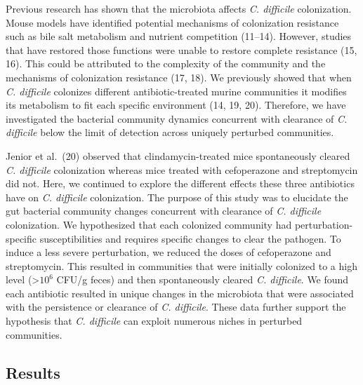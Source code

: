 \documentclass[12pt,]{article}
\begin{document}
Previous research has shown that the microbiota affects \emph{C.
difficile} colonization. Mouse models have identified potential
mechanisms of colonization resistance such as bile salt metabolism and
nutrient competition (11--14). However, studies that have restored those
functions were unable to restore complete resistance (15, 16). This
could be attributed to the complexity of the community and the
mechanisms of colonization resistance (17, 18). We previously showed
that when \emph{C. difficile} colonizes different antibiotic-treated
murine communities it modifies its metabolism to fit each specific
environment (14, 19, 20). Therefore, we have investigated the bacterial
community dynamics concurrent with clearance of \emph{C. difficile}
below the limit of detection across uniquely perturbed communities.

Jenior et al.~(20) observed that clindamycin-treated mice spontaneously
cleared \emph{C. difficile} colonization whereas mice treated with
cefoperazone and streptomycin did not. Here, we continued to explore the
different effects these three antibiotics have on \emph{C. difficile}
colonization. The purpose of this study was to elucidate the gut
bacterial community changes concurrent with clearance of \emph{C.
difficile} colonization. We hypothesized that each colonized community
had perturbation-specific susceptibilities and requires specific changes
to clear the pathogen. To induce a less severe perturbation, we reduced
the doses of cefoperazone and streptomycin. This resulted in communities
that were initially colonized to a high level (\textgreater{}\(10^{6}\)
CFU/g feces) and then spontaneously cleared \emph{C. difficile}. We
found each antibiotic resulted in unique changes in the microbiota that
were associated with the persistence or clearance of \emph{C.
difficile}. These data further support the hypothesis that \emph{C.
difficile} can exploit numerous niches in perturbed communities.

\hypertarget{results}{%
\subsection{Results}\label{results}}
\end{document}
